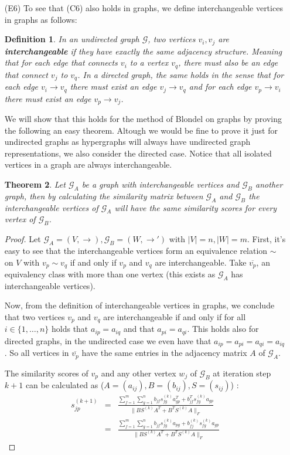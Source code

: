 \documentclass[a4paper,11pt]{report}
\newtheorem{theorem}{Theorem}[section]
\newtheorem{definition}[theorem]{Definition}
\newcommand{\graf}{\mathscr{G}}
\begin{document}
\begin{itemize}
  \item[(E6)]  To see that (C6) also holds in graphs, we define interchangeable vertices in graphs 
  as follows:
  \begin{definition} In an undirected graph $\graf$, two vertices $v_i, v_j$ are \textbf{interchangeable} if they have exactly the same 
  adjacency structure. Meaning that for each edge that connects $v_i$ to a vertex $v_q$, there must also 
  be an edge that connect $v_j$ to $v_q$.  In a directed graph, the same holds 
  in the sense that for each edge $v_i \to v_q$ there must exist an edge $v_j \to v_q$ 
  and for each edge $v_p \to v_i$ there must exist an edge $v_p \to v_j$.
  \end{definition}
  We will show that this holds for the method of Blondel on graphs by proving the 
  following an easy theorem. Altough we would be fine to prove it just for undirected graphs as hypergraphs
  will always have undirected graph representations, we also consider the 
  directed case. Notice that all isolated vertices in a graph are always 
  interchangeable.
 \begin{theorem}
    Let $\graf_A$ be a graph with interchangeable vertices and $\graf_B$ another 
    graph, then by calculating the similarity matrix between $\graf_A$ and 
    $\graf_B$ the interchangeable vertices of $\graf_A$ will have the same similarity scores for every vertex of $\graf_B$. 
  \end{theorem}
  \begin{proof}
    Let $\graf_A = (V,\to), \graf_B = (W,\to')$ with $|V|=n, |W|=m$. First, it's easy to see that the interchangeable vertices form an equivalence relation $\sim$ on 
    $V$ with $v_p \sim v_q$ if and only if $v_p$ and $v_q$ are interchangeable. 
    Take $\overline{v_p}$, an equivalency class with more than one vertex (this exists as $\graf_A$ has interchangeable 
    vertices).  
    
    Now, from the definition of interchangeable vertices in graphs, we conclude 
    that two vertices $v_p$ and $v_q$ are interchangeable if and only if for all $i \in \{1,\ldots,n\}$ 
    holds that $a_{ip} = a_{iq}$ and 
    that $a_{pi} = a_{qi}$. This holds also for directed graphs, in the 
    undirected case we even have that $a_{ip} = a_{pi} = a_{qi} = a_{iq}$. So 
    all vertices in $\overline{v_p}$ have the same entries in the adjacency matrix $A$ of $\graf_A$. 
    
    
   The similarity scores of $v_p$ and any other vertex $w_j$  of 
    $\graf_B$ at iteration step $k+1$ can be calculated as ($A = (a_{ij}), B=(b_{ij}), S=(s_{ij})$) :
    \begin{eqnarray}
      s^{(k+1)}_{jp} &=& \frac{\sum^m_{f=1}\sum^n_{g=1} b_{jf}s^{(k)}_{fg}a^T_{gp} + 
    b^T_{jf}s^{(k)}_{fg}a_{gp} }{\|BS^{(k)}A^T + B^TS^{(k)}A\|_F}\\
    &=& \frac{\sum^m_{f=1}\sum^n_{g=1} b_{jf}s^{(k)}_{fg}a_{pg} + 
    b_{fj}^{(k)}s^{(k)}_{fg}a_{gp} }{\|BS^{(k)}A^T + B^TS^{(k)}A\|_F}\label{uitgeschrevenblondel2}
    \end{eqnarray}
   

\end{proof}
\end{itemize}
\end{document}
